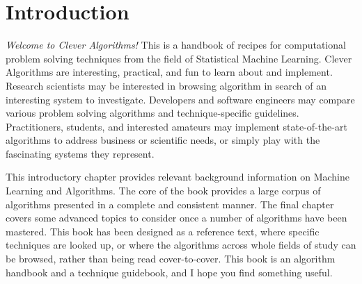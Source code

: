 

\chapter{Introduction}
\label{chap:intro}
\emph{Welcome to Clever Algorithms!} This is a handbook of recipes for computational problem solving techniques from the field of Statistical Machine Learning. 
Clever Algorithms are interesting, practical, and fun to learn about and implement.
Research scientists may be interested in browsing algorithm in search of an interesting system to investigate. Developers and software engineers may compare various problem solving algorithms and technique-specific guidelines. Practitioners, students, and interested amateurs may implement state-of-the-art algorithms to address business or scientific needs, or simply play with the fascinating systems they represent.

This introductory chapter provides relevant background information on Machine Learning and Algorithms. The core of the book provides a large corpus of algorithms presented in a complete and consistent manner. The final chapter covers some advanced topics to consider once a number of algorithms have been mastered. This book has been designed as a reference text, where specific techniques are looked up, or where the algorithms across whole fields of study can be browsed, rather than being read cover-to-cover. This book is an algorithm handbook and a technique guidebook, and I hope you find something useful.

\newpage\begin{bibunit}\putbib\end{bibunit}
\newpage\begin{bibunit}\putbib\end{bibunit}
\newpage\begin{bibunit}\putbib\end{bibunit}
\newpage\begin{bibunit}\putbib\end{bibunit}
\newpage\begin{bibunit}\putbib\end{bibunit}

